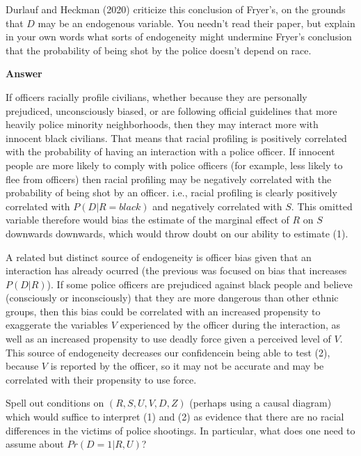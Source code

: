 \documentclass[11pt]{exam}
\begin{document}
\begin{questions}
    \question Durlauf and Heckman (2020) criticize this conclusion of
Fryer's, on the grounds that \(D\) may be an endogenous variable. You
needn't read their paper, but explain in your own words what sorts of
endogeneity might undermine Fryer's conclusion that the probability of
being shot by the police doesn't depend on race.

\textbf{Answer}

If officers racially profile civilians, whether because they are
personally prejudiced, unconsciously biased, or are following official
guidelines that more heavily police minority neighborhoods, then they
may interact more with innocent black civilians. That means that racial
profiling is positively correlated with the probability of having an
interaction with a police officer. If innocent people are more likely to
comply with police officers (for example, less likely to flee from
officers) then racial profiling may be negatively correlated with the
probability of being shot by an officer. i.e., racial profiling is
clearly positively correlated with \(P(D | R = black)\) and negatively
correlated with \(S\). This omitted variable therefore would bias the
estimate of the marginal effect of \(R\) on \(S\) downwards downwards,
which would throw doubt on our ability to estimate (1).

A related but distinct source of endogeneity is officer bias given that
an interaction has already ocurred (the previous was focused on bias
that increases \(P(D|R)\)). If some police officers are prejudiced
against black people and believe (consciously or inconsciously) that
they are more dangerous than other ethnic groups, then this bias could
be correlated with an increased propensity to exaggerate the variables
\(V\) experienced by the officer during the interaction, as well as an
increased propensity to use deadly force given a perceived level of
\(V\). This source of endogeneity decreases our confidencein being able
to test (2), because \(V\) is reported by the officer, so it may not be
accurate and may be correlated with their propensity to use force.

    \question Spell out conditions on \((R,S,U,V,D,Z)\) (perhaps using a
causal diagram) which would suffice to interpret (1) and (2) as evidence
that there are no racial differences in the victims of police shootings.
In particular, what does one need to assume about \(Pr(D = 1|R,U)\)?


\end{questions}
\end{document}
